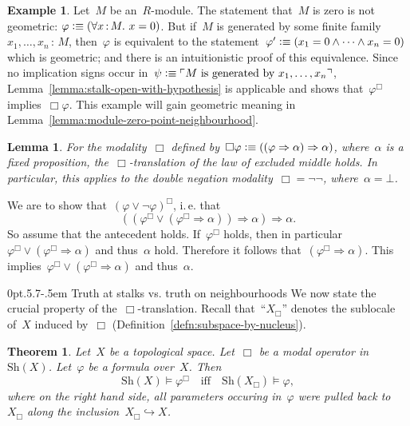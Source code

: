 \documentclass[10pt,reqno,a4paper]{amsbook}
\makeatletter
\theoremstyle{definition}
\newtheorem{ex}[defn]{Example}
\theoremstyle{plain}
\newtheorem{lemma}[defn]{Lemma}
\newtheorem{thm}[defn]{Theorem}
\theoremstyle{remark}
\newcommand{\Sh}{\mathrm{Sh}}
\newcommand{\?}{\,{:}\,}
\renewcommand{\_}{\mathpunct{.}\,}
\newcommand{\speak}[1]{\ulcorner\text{\textnormal{#1}}\urcorner}
\newcommand{\ie}{i.\,e.\@\xspace}
\newcommand{\vs}{vs.\@\xspace}
\newcommand{\XXXh}[1]{}
\newcommand{\defequiv}{\vcentcolon\equiv}
\renewenvironment{proof}[1][\proofname]{\par
  \pushQED{\qed}%
  \normalfont \topsep6\p@\@plus6\p@\relax
  \trivlist
  \item[\hskip\labelsep
        \itshape
    #1\@addpunct{.}]\ignorespaces
}{%
  \popQED\endtrivlist\@endpefalse
}
\def\subsection{\@startsection{subsection}{2}%
  {0pt}{.5\linespacing\@plus.7\linespacing}{-.5em}%
  {\normalfont\bfseries}}
\makeatother
\begin{document}
\begin{ex}\label{ex:module-zero-geometric}
Let~$M$ be an~$R$-module. The statement that~$M$ is zero is not
geometric: $\varphi \defequiv (\forall x\?M\_ x = 0)$. But if~$M$ is generated by some finite
family~$x_1,\ldots,x_n\?M$, then~$\varphi$ is equivalent to the
statement~$\varphi' \defequiv (x_1 = 0
\wedge \cdots \wedge x_n = 0)$ which is geometric; and there is an
intuitionistic proof of this equivalence. Since no implication signs occur
in~$\psi \defequiv \speak{$M$ is generated by~$x_1,\ldots,x_n$}$, Lemma~\ref{lemma:stalk-open-with-hypothesis} is
applicable and shows that~$\varphi^\Box$ implies~$\Box\varphi$.
This example will gain geometric meaning in
Lemma~\ref{lemma:module-zero-point-neighbourhood}.
\end{ex}

\begin{lemma}For the modality~$\Box$ defined by~$\Box\varphi \defequiv ((\varphi
      \Rightarrow \alpha) \Rightarrow \alpha)$, where~$\alpha$ is a fixed
proposition, the~$\Box$-translation of the law of excluded middle holds.
In particular, this applies to the double negation modality~$\Box = \neg\neg$, where~$\alpha =
\bot$.\end{lemma}
\begin{proof}We are to show that~$(\varphi \vee \neg\varphi)^\Box$, \ie that
\[ ((\varphi^\Box \vee (\varphi^\Box \Rightarrow \alpha)) \Longrightarrow
    \alpha) \Longrightarrow \alpha. \]
So assume that the antecedent holds. If~$\varphi^\Box$ holds, then in
particular~$\varphi^\Box \vee (\varphi^\Box \Rightarrow \alpha)$ and thus~$\alpha$
hold. Therefore it follows that~$(\varphi^\Box \Rightarrow \alpha)$. This
implies~$\varphi^\Box \vee (\varphi^\Box \Rightarrow \alpha)$ and
thus~$\alpha$.
\end{proof}


\subsection{\texorpdfstring{Truth at stalks \vs truth on neighbourhoods}{Truth
at stalks vs. truth on neighbourhoods}}\label{sect:spreading}
We now state the crucial property of the~$\Box$-translation. Recall
that~``$X_\Box$'' denotes the sublocale of~$X$ induced by~$\Box$
(Definition~\ref{defn:subspace-by-nucleus}).
\begin{thm}\label{thm:box-translation-semantically}
Let~$X$ be a topological space. Let~$\Box$ be a modal operator
in~$\Sh(X)$. Let~$\varphi$ be a formula over~$X$. Then
\[ \Sh(X) \models \varphi^\Box \quad\text{iff}\quad
  \Sh(X_\Box) \models \varphi, \]
where on the right hand side, all parameters occuring in~$\varphi$ were pulled
back to~$X_\Box$ along the inclusion~$X_\Box \hookrightarrow X$.
\end{thm}
\XXXh{think about powersets appearing as domains of quantification}
\end{document}
